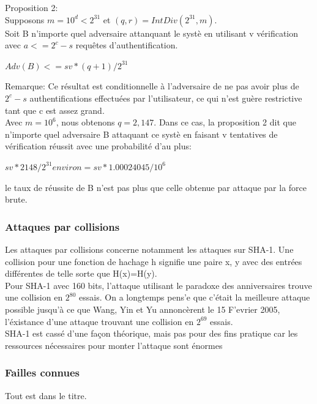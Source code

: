 \documentclass{../res/univ-projet}
\begin{document}
   	Proposition 2:\\
   	Supposons $m = 10^d < 2^{31}$ et $(q, r) = IntDiv(2^{31},m)$.\\
   	Soit B n'importe quel adversaire attanquant le syst\`{e} en utilisant v v\'{e}rification avec $a <= 2^c - s		$ requ\^{e}tes d'authentification.\\
   	\begin{center} 
   		$Adv(B) < = sv * (q+1)/ 2^{31}$\\
   	\end{center}
   	Remarque: Ce r\'{e}sultat est conditionnelle à l'adversaire de ne pas avoir plus
   	de $2^c - s$ authentifications effectu\'{e}es par l'utilisateur, ce qui n'est gu\`{e}re
  	restrictive tant que c est assez grand.\\
  	Avec $m = 10^6$, nous obtenons $q = 2,147$. Dans ce cas, la proposition 2 dit
  	que n'importe quel adversaire B attaquant ce syst\`{e} en faisant v tentatives de v\'{e}rification
   	r\'{e}ussit avec une probabilit\'{e} d'au plus:\\
   	\begin{center} 
   		$sv * 2148/2^{31} environ = sv * 1.00024045/10^6$\\
   	\end{center}
   	le taux de réussite de B n'est pas plus que celle obtenue par attaque par la force brute.
   	

    \subsubsection{Attaques par collisions}
    Les attaques par collisions concerne notamment les attaques sur SHA-1. Une collision pour une fonction de hachage h signifie une paire x, y avec des entr\'{e}es diff\'{e}rentes de telle sorte que H(x)=H(y).\\
    Pour SHA-1 avec 160 bits, l'attaque utilisant le paradoxe des anniversaires trouve une collision en $2^{80}$ essais. On a longtemps pens'{e} que c'\'{e}tait la meilleure attaque possible jusqu'\`{a} ce que Wang, Yin et Yu annonc\`{e}rent le 15 F'{e}vrier 2005, l'\'{e}xistance d'une attaque trouvant une collision en $2^{69}$ essais.\\
   SHA-1 est cassé d'une fa\c con th\'{e}orique, mais pas pour des fins pratique car les ressources n\'{e}cessaires pour monter l'attaque sont énormes
    
    \subsubsection{Failles connues}
    Tout est dans le titre.
    
\end{document}
